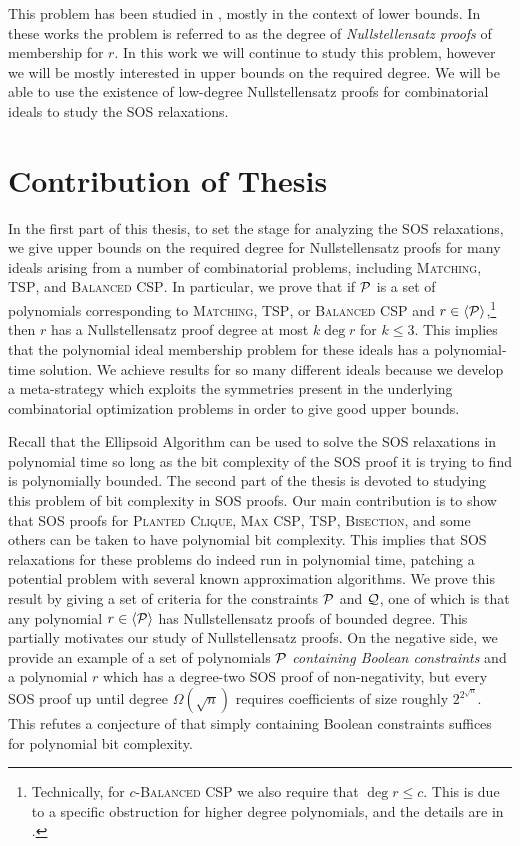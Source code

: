 This problem has been studied in \cite{BIKPP94,BT98,Gri98,BGIP01}, mostly in the context of lower bounds. In these works the problem is referred to as the degree of \emph{Nullstellensatz proofs} of membership for $r$. In this work we will continue to study this problem, however we will be mostly interested in upper bounds on the required degree. We will be able to use the existence of low-degree Nullstellensatz proofs for combinatorial ideals to study the SOS relaxations. 



\section{Contribution of Thesis}\label{sec:intro_contrib}

In the first part of this thesis, to set the stage for analyzing the SOS relaxations, we give upper bounds on the required degree for Nullstellensatz proofs for many ideals arising from a number of combinatorial problems, including \textsc{Matching}, \textsc{TSP}, and \textsc{Balanced CSP}. In particular, we prove that if $\mathcal P$ is a set of polynomials corresponding to \textsc{Matching}, \textsc{TSP}, or \textsc{Balanced CSP} and $r \in \langle \mathcal P \rangle$,\footnote{Technically, for \textsc{$c$-Balanced CSP} we also require that $\deg r \leq c$. This is due to a specific obstruction for higher degree polynomials, and the details are in .} then $r$ has a Nullstellensatz proof degree at most $k\deg r$ for $k\leq 3$. This implies that the polynomial ideal membership problem for these ideals has a polynomial-time solution. We achieve results for so many different ideals because we develop a meta-strategy which exploits the symmetries present in the underlying combinatorial optimization problems in order to give good upper bounds.

Recall that the Ellipsoid Algorithm can be used to solve the SOS relaxations in polynomial time so long as the bit complexity of the SOS proof it is trying to find is polynomially bounded. 
The second part of the thesis is devoted to studying this problem of bit complexity in SOS proofs. 
Our main contribution is to show that SOS proofs for \textsc{Planted Clique}, \textsc{Max CSP}, \textsc{TSP}, \textsc{Bisection}, and some others can be taken to have polynomial bit complexity. This implies that SOS relaxations for these problems do indeed run in polynomial time, patching a potential problem with several known approximation algorithms. We prove this result by giving a set of criteria for the constraints $\mathcal P$ and $\mathcal Q$, one of which is that any polynomial $r \in \langle \mathcal P \rangle$ has Nullstellensatz proofs of bounded degree. This partially motivates our study of Nullstellensatz proofs. 
On the negative side, we provide an example of a set of polynomials $\mathcal P$ \emph{containing Boolean constraints} and a polynomial $r$ which has a degree-two SOS proof of non-negativity, but every SOS proof up until degree $\Omega(\sqrt{n})$ requires coefficients of size roughly $2^{2^{\sqrt{n}}}$. This refutes a conjecture of \cite{ODon16} that simply containing Boolean constraints suffices for polynomial bit complexity. 

